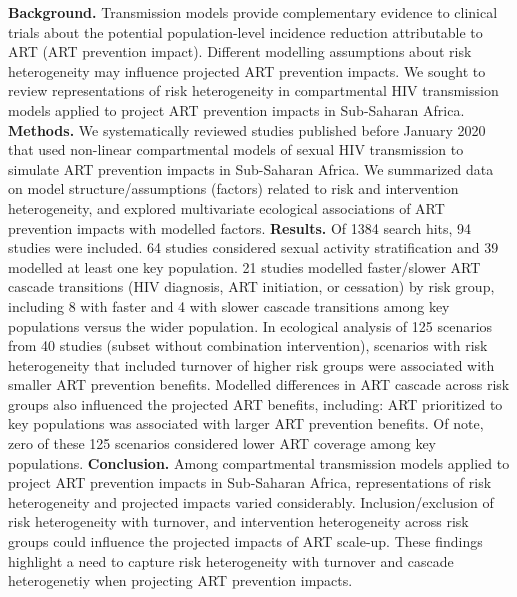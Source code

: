 \textbf{Background.}
Transmission models provide complementary evidence to clinical trials about
the potential population-level incidence reduction attributable to ART (ART prevention impact).
Different modelling assumptions about risk heterogeneity may influence projected ART prevention impacts.
We sought to review representations of risk heterogeneity in compartmental HIV transmission models
applied to project ART prevention impacts in Sub-Saharan Africa.
\textbf{Methods.}
We systematically reviewed studies published before January 2020 that used
non-linear compartmental models of sexual HIV transmission
to simulate ART prevention impacts in Sub-Saharan Africa.
We summarized data on model structure/assumptions (factors) related to risk and intervention heterogeneity,
and explored multivariate ecological associations of ART prevention impacts with modelled factors.
\textbf{Results.}
Of 1384 search hits, 94 studies were included.
64 studies considered sexual activity stratification and 39 modelled at least one key population.
21 studies modelled faster/slower ART cascade transitions (HIV diagnosis, ART initiation, or cessation) by risk group,
including 8 with faster and 4 with slower cascade transitions among key populations versus the wider population.
In ecological analysis of 125 scenarios from 40 studies (subset without combination intervention),
scenarios with risk heterogeneity that included turnover of higher risk groups
were associated with smaller ART prevention benefits.
Modelled differences in ART cascade across risk groups also influenced the projected ART benefits, including:
ART prioritized to key populations was associated with larger ART prevention benefits.
Of note, zero of these 125 scenarios considered lower ART coverage among key populations.
\textbf{Conclusion.}
Among compartmental transmission models applied to project ART prevention impacts in Sub-Saharan Africa,
representations of risk heterogeneity and projected impacts varied considerably.
Inclusion/exclusion of risk heterogeneity with turnover, and intervention heterogeneity across risk groups
could influence the projected impacts of ART scale-up.
These findings highlight a need to capture
risk heterogeneity with turnover and cascade heterogenetiy when projecting ART prevention impacts.
